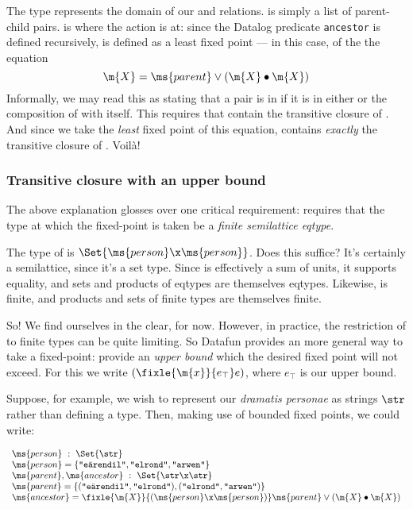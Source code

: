 The type  represents the domain of our  and 
relations.  is simply a list of parent-child pairs.  is
where the action is at: since the Datalog predicate \texttt{ancestor} is defined
recursively,  is defined as a least fixed point --- in this case,
of the the equation
\begin{equation*}
  \m{X} = \ms{parent} \vee (\m{X} \bullet \m{X})
\end{equation*}
Informally, we may read this as stating that a pair is in  if it is in
either  or the composition of  with itself. This requires that
 contain the transitive closure of . And since we take the
\emph{least} fixed point of this equation,  contains \emph{exactly}
the transitive closure of . Voil\`a!


\subsubsection{Transitive closure with an upper bound}

The above explanation glosses over one critical requirement:  requires
that the type at which the fixed-point is taken be a \emph{finite semilattice
  eqtype}.

The type of  is $\Set{\ms{person} \x \ms{person}}$. Does this
suffice? It's certainly a semilattice, since it's a set type. Since 
is effectively a sum of units, it supports equality, and sets and products of
eqtypes are themselves eqtypes. Likewise,  is finite, and products
and sets of finite types are themselves finite.

So! We find ourselves in the clear, for now. However, in practice, the
restriction of  to finite types can be quite limiting. So Datafun
provides an more general way to take a fixed-point: provide an \emph{upper
  bound} which the desired fixed point will not exceed. For this we write
$(\fixle{\m{x}}{e_\top} e)$, where $e_\top$ is our upper bound.

Suppose, for example, we wish to represent our \textit{dramatis personae} as
strings $\str$ rather than defining a  type. Then, making use of
bounded fixed points, we could write:

\[\begin{array}{l}
\ms{person} ~:~ \Set{\str}\\
\ms{person} = \{\texttt{"e\"arendil"}, \texttt{"elrond"}, \texttt{"arwen"}\}\\
\ms{parent}, \ms{ancestor} ~:~ \Set{\str \x \str}\\
\ms{parent} = \{(\texttt{"e\"arendil"}, \texttt{"elrond"}),
(\texttt{"elrond"}, \texttt{"arwen"})\}\\
\ms{ancestor} = \fixle{\m{X}}{(\ms{person} \x \ms{person})}
\ms{parent} \vee (\m{X} \bullet \m{X})
\end{array}\]

